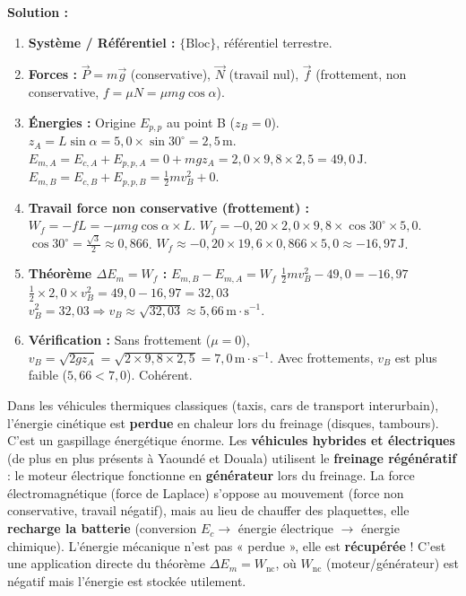 \documentclass[11pt]{article}
\begin{document}
\begin{exoresolu}
\textbf{Solution :}
\begin{enumerate}
    \item \textbf{Système / Référentiel :} $\{ \text{Bloc} \}$, référentiel terrestre.
    \item \textbf{Forces :} $\vec{P}=m\vec{g}$ (conservative), $\vec{N}$ (travail nul), $\vec{f}$ (frottement, non conservative, $f = \mu N = \mu mg\cos\alpha$).
    \item \textbf{Énergies :} Origine $E_{p,p}$ au point B ($z_B=0$).
        $z_A = L\sin\alpha = 5,0 \times \sin 30^\circ = 2,5\,\text{m}$.
        $E_{m,A} = E_{c,A} + E_{p,p,A} = 0 + mgz_A = 2,0 \times 9,8 \times 2,5 = 49,0\,\text{J}$.
        $E_{m,B} = E_{c,B} + E_{p,p,B} = \frac{1}{2}mv_B^2 + 0$.
    \item \textbf{Travail force non conservative (frottement) :}
        $W_f = -f L = -\mu mg\cos\alpha \times L$.
        $W_f = -0,20 \times 2,0 \times 9,8 \times \cos 30^\circ \times 5,0$.
        $\cos 30^\circ = \frac{\sqrt{3}}{2} \approx 0,866$.
        $W_f \approx -0,20 \times 19,6 \times 0,866 \times 5,0 \approx -16,97\,\text{J}$.
    \item \textbf{Théorème $\Delta E_m = W_f$ :}
        $E_{m,B} - E_{m,A} = W_f$
        $\frac{1}{2}mv_B^2 - 49,0 = -16,97$
        $\frac{1}{2} \times 2,0 \times v_B^2 = 49,0 - 16,97 = 32,03$
        $v_B^2 = 32,03 \Rightarrow v_B \approx \sqrt{32,03} \approx \boxed{5,66\,\text{m}\!\cdot\!\text{s}^{-1}}$.
    \item \textbf{Vérification :} Sans frottement ($\mu=0$), $v_B = \sqrt{2gz_A} = \sqrt{2\times9,8\times2,5} = 7,0\,\text{m}\!\cdot\!\text{s}^{-1}$. Avec frottements, $v_B$ est plus faible ($5,66 < 7,0$). Cohérent.
\end{enumerate}
\end{exoresolu}

\begin{savaistu}
Dans les véhicules thermiques classiques (taxis, cars de transport interurbain), l'énergie cinétique est \textbf{perdue} en chaleur lors du freinage (disques, tambours). C'est un gaspillage énergétique énorme.
Les \textbf{véhicules hybrides et électriques} (de plus en plus présents à Yaoundé et Douala) utilisent le \textbf{freinage régénératif} : le moteur électrique fonctionne en \textbf{générateur} lors du freinage. La force électromagnétique (force de Laplace) s'oppose au mouvement (force non conservative, travail négatif), mais au lieu de chauffer des plaquettes, elle \textbf{recharge la batterie} (conversion $E_c \rightarrow$ énergie électrique $\rightarrow$ énergie chimique). L'énergie mécanique n'est pas « perdue », elle est \textbf{récupérée} ! C'est une application directe du théorème $\Delta E_m = W_{\text{nc}}$, où $W_{\text{nc}}$ (moteur/générateur) est négatif mais l'énergie est stockée utilement.
\end{savaistu}
\end{document}
